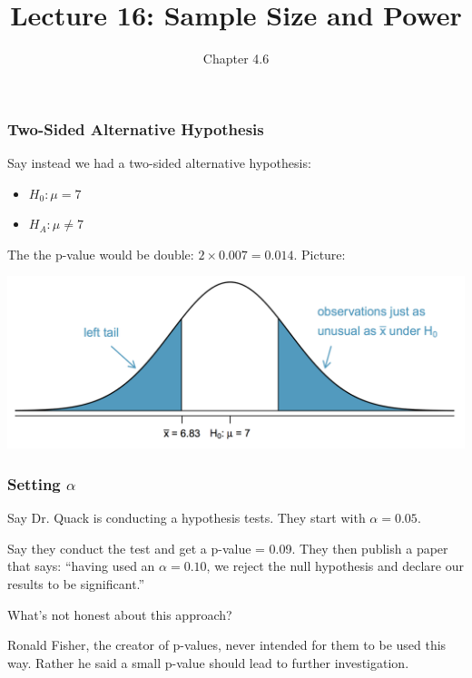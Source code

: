\documentclass[handout]{beamer}
\title{Lecture 16: Sample Size and Power}
\author{Chapter 4.6}
\date{}
\newcommand{\blue}[1]{\textcolor{blue2}{#1}}
\begin{document}
\begin{frame}
\titlepage
\end{frame}


\begin{frame}
\frametitle{Two-Sided Alternative Hypothesis}
Say instead we had a \blue{two-sided alternative hypothesis}:

\begin{itemize}
\item $H_0: \mu = 7$
\item $H_A: \mu \neq 7$
\end{itemize}

\pause The the p-value would be double: $2 \times 0.007= 0.014$.  Picture:

\begin{center}
\includegraphics[width=\textwidth]{figure/two-sided.png}
\end{center}

\end{frame}


\begin{frame}[fragile]
\frametitle{Setting $\alpha$}

Say Dr. Quack is conducting a hypothesis tests.  They start with $\alpha=0.05$.

\pause\vspace{0.5cm}

Say they conduct the test and get a \blue{p-value = 0.09}.  They then publish a paper that says: ``having used an \blue{$\alpha=0.10$}, we reject the null hypothesis and declare our results to be significant.''

\pause\vspace{0.5cm}
What's not honest about this approach?

\pause\vspace{0.5cm}
Ronald Fisher, the creator of p-values, never intended for them to be used this way.  Rather he said a small p-value should lead to further investigation.  

\end{frame}
\end{document}
